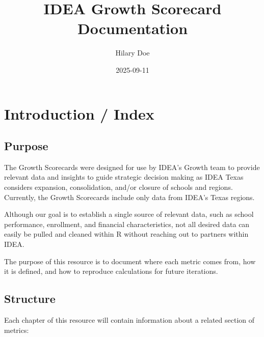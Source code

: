 \documentclass[
  letterpaper,
  DIV=11,
  numbers=noendperiod]{scrreprt}
\title{IDEA Growth Scorecard Documentation}
\author{Hilary Doe}
\date{2025-09-11}
\renewcommand*\contentsname{Table of contents}
\newcommand\contentsname{Table of contents}
\begin{document}
\maketitle

\renewcommand*\contentsname{Table of contents}
{
\hypersetup{linkcolor=}
\setcounter{tocdepth}{2}
\tableofcontents
}


\chapter*{Introduction / Index}\label{introduction-index}


\section*{Purpose}\label{purpose}


The Growth Scorecards were designed for use by IDEA's Growth team to
provide relevant data and insights to guide strategic decision making as
IDEA Texas considers expansion, consolidation, and/or closure of schools
and regions. Currently, the Growth Scorecards include only data from
IDEA's Texas regions.

Although our goal is to establish a single source of relevant data, such
as school performance, enrollment, and financial characteristics, not
all desired data can easily be pulled and cleaned within R without
reaching out to partners within IDEA.

The purpose of this resource is to document where each metric comes
from, how it is defined, and how to reproduce calculations for future
iterations.

\section*{Structure}\label{structure}


Each chapter of this resource will contain information about a related
section of metrics:
\end{document}
